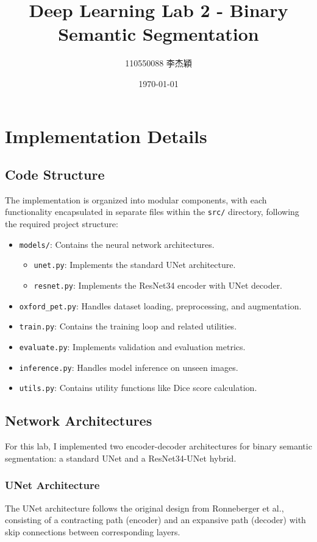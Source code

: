 \documentclass[twocolumn,a4paper]{article}
\title{Deep Learning Lab 2 - Binary Semantic Segmentation}
\author{110550088 李杰穎}
\date{\today}
\begin{document}
\maketitle

\section{Implementation Details}

\subsection{Code Structure}
The implementation is organized into modular components, with each functionality encapsulated in separate files within the \texttt{src/} directory, following the required project structure:

\begin{itemize}
    \item \texttt{models/}: Contains the neural network architectures.
        \begin{itemize}
            \item \texttt{unet.py}: Implements the standard UNet architecture.
            \item \texttt{resnet.py}: Implements the ResNet34 encoder with UNet decoder.
        \end{itemize}
    \item \texttt{oxford\_pet.py}: Handles dataset loading, preprocessing, and augmentation.
    \item \texttt{train.py}: Contains the training loop and related utilities.
    \item \texttt{evaluate.py}: Implements validation and evaluation metrics.
    \item \texttt{inference.py}: Handles model inference on unseen images.
    \item \texttt{utils.py}: Contains utility functions like Dice score calculation.
\end{itemize}

\subsection{Network Architectures}
For this lab, I implemented two encoder-decoder architectures for binary semantic segmentation: a standard UNet and a ResNet34-UNet hybrid.

\subsubsection{UNet Architecture}
The UNet architecture follows the original design from Ronneberger et al., consisting of a contracting path (encoder) and an expansive path (decoder) with skip connections between corresponding layers.
\end{document}
